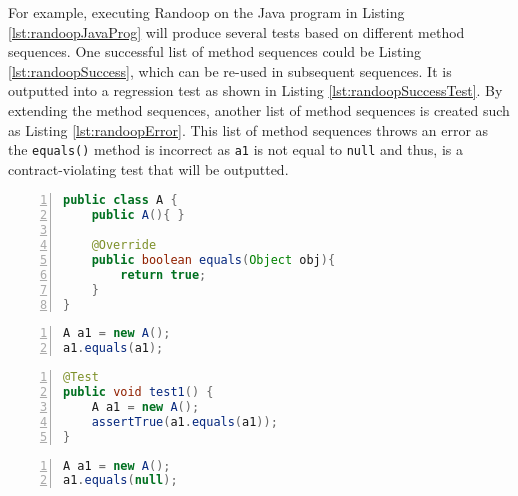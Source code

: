 For example, executing Randoop on the Java program in Listing \ref{lst:randoopJavaProg} will produce several tests based on different method sequences.
One successful list of method sequences could be Listing \ref{lst:randoopSuccess},  which can be re-used in subsequent sequences. It is outputted into a regression test as shown in Listing \ref{lst:randoopSuccessTest}.
By extending the method sequences, another list of method sequences is created such as Listing \ref{lst:randoopError}.
This list of method sequences throws an error as the \texttt{equals()} method is incorrect as \texttt{a1} is not equal to \texttt{null} and thus, is a contract-violating test that will be outputted.

\begin{lstlisting}[language=Java, tabsize=3, numbers=left,
label={lst:randoopJavaProg}, caption={Example Java class},
captionpos=b, frame=single]
public class A {
	public A(){ }
	
	@Override
	public boolean equals(Object obj){
		return true;
	}
}
\end{lstlisting}

\begin{lstlisting}[language=Java, tabsize=3, numbers=left,
label={lst:randoopSuccess}, caption={Successful method sequence for testing Listing \ref{lst:randoopJavaProg}},
captionpos=b, frame=single]
A a1 = new A();
a1.equals(a1);
\end{lstlisting}

\begin{lstlisting}[language=Java, tabsize=3, numbers=left,
label={lst:randoopSuccessTest}, caption={Test output for the successful method sequence in Listing \ref{lst:randoopSuccess}},
captionpos=b, frame=single]
@Test
public void test1() {
	A a1 = new A();
	assertTrue(a1.equals(a1));
}
\end{lstlisting}

\begin{lstlisting}[language=Java, tabsize=3, numbers=left,
label={lst:randoopError}, caption={Contract violating method sequence for testing Listing \ref{lst:randoopJavaProg}},
captionpos=b, frame=single]
A a1 = new A();
a1.equals(null);
\end{lstlisting}


